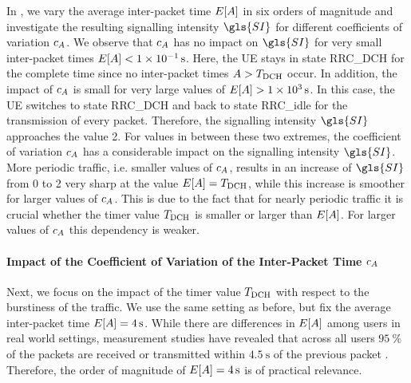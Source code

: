 In , we vary the average inter-packet time \(E[A]\) in six orders of magnitude and investigate the resulting signalling intensity \(\gls{SI}\) for different coefficients of variation \(c_{A}\).
We observe that \(c_{A}\) has no impact on \(\gls{SI}\) for very small inter-packet times \(E[A]<\SI{1e-1}{\second}\).
Here, the \gls{UE} stays in state \gls{RRC_DCH} for the complete time since no inter-packet times \(A>T_{\text{DCH}}\) occur.
In addition, the impact of \(c_{A}\) is small for very large values of \(E[A]>\SI{1e3}{\second}\).
In this case, the \gls{UE} switches to state \gls{RRC_DCH} and back to state \gls{RRC_idle} for the transmission of every packet. Therefore, the signalling intensity \(\gls{SI}\) approaches the value 2.
For values in between these two extremes, the coefficient of variation \(c_{A}\) has a considerable impact on the signalling intensity \(\gls{SI}\).
More periodic traffic, i.e. smaller values of \(c_{A}\), results in an increase of \(\gls{SI}\) from 0 to 2 very sharp at the value \(E[A]=T_{\text{DCH}}\), while this increase is smoother for larger values of \(c_{A}\).
This is due to the fact that for nearly periodic traffic it is crucial whether the timer value \(T_{\text{DCH}}\) is smaller or larger than \(E[A]\).
For larger values of \(c_{A}\) this dependency is weaker.

\paragraph*{Impact of the Coefficient of Variation of the Inter-Packet Time \(c_A\)}

Next, we focus on the impact of the timer value \(T_{\text{DCH}}\) with respect to the burstiness of the traffic.
We use the same setting as before, but fix the average inter-packet time \(E[A]=\SI{4}{\second}\).
While there are differences in \(E[A]\) among users in real world settings, measurement studies have revealed that across all users \(\SI{95}{\percent}\) of the packets are received or transmitted within \(\SI{4.5}{\second}\) of the previous packet \cite{Falaki2010a}.
Therefore, the order of magnitude of \(E[A]=\SI{4}{\second}\) is of practical relevance.

